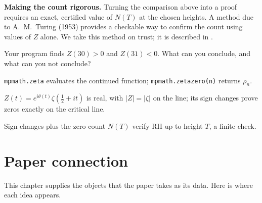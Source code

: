 \begin{beyond}
\textbf{Making the count rigorous.} Turning the comparison above into a proof requires an exact, certified value of $N(T)$ at the chosen heights. A method due to A.~M.~Turing (1953) provides a checkable way to confirm the count using values of $Z$ alone. We take this method on trust; it is described in \cite{edwards}.
\end{beyond}

\begin{checkpoint}
Your program finds $Z(30)>0$ and $Z(31)<0$. What can you conclude, and what can you not conclude?
\end{checkpoint}

\begin{keyideas}
\item \texttt{mpmath.zeta} evaluates the continued function; \texttt{mpmath.zetazero(n)} returns $\rho_n$.
\item $Z(t)=e^{i\theta(t)}\zeta(\tfrac12+it)$ is real, with $|Z|=|\zeta|$ on the line; its sign changes prove zeros exactly on the critical line.
\item Sign changes plus the zero count $N(T)$ verify RH up to height $T$, a finite check.
\end{keyideas}

\section{Paper connection}\label{sec:zeta-paper}

This chapter supplies the objects that the paper \cite{soniR1} takes as its data. Here is where each idea appears.

